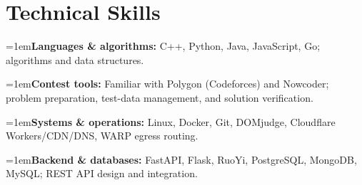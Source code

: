 \documentclass[10pt,a4paper]{article}
\newcommand{\skillrow}[2]{%
  \par\noindent\hangindent=1em\hangafter=1\textbf{#1: }#2\par
}
\begin{document}
\section{Technical Skills}
\skillrow{Languages \& algorithms}{C++, Python, Java, JavaScript, Go; algorithms and data structures.}
\skillrow{Contest tools}{Familiar with Polygon (Codeforces) and Nowcoder; problem preparation, test-data management, and solution verification.}
\skillrow{Systems \& operations}{Linux, Docker, Git, DOMjudge, Cloudflare Workers/CDN/DNS, WARP egress routing.}
\skillrow{Backend \& databases}{FastAPI, Flask, RuoYi, PostgreSQL, MongoDB, MySQL; REST API design and integration.}
\end{document}
